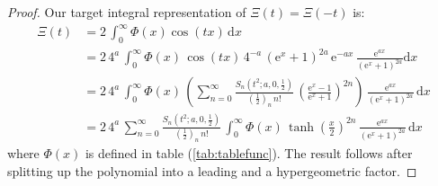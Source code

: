 \documentclass[a4paper,11pt,twoside]{amsart}
\begin{document}
\begin{proof}
Our target integral representation of $\Xi(t) = \Xi(-t)$ is:
\begin{align}
 \Xi(t) &= 2\,\int_{0}^\infty \Phi(x)\cos(tx)\, \mathrm{d}x \\
 &= 2\,4^a\,\int_{0}^\infty \Phi(x)\,\cos(tx)\,4^{-a}\,(\mathrm{e}^x+1)^{2a}\,\mathrm{e}^{-ax} \,\frac{\mathrm{e}^{ax}}{(\mathrm{e}^x+1)^{2a}} \mathrm{d}x \\
 &= 2\,4^a\,\int_{0}^\infty \Phi(x)\,\left(\sum_{n=0}^\infty \frac{S_n\left(t^2;a,0,\frac12\right)}{\left(\frac12\right)_n\,n!}\, \left(\frac{\textrm{e}^{x}-1}{\textrm{e}^{x}+1}\right)^{2n}\right)\,\frac{\mathrm{e}^{ax}}{(\mathrm{e}^x+1)^{2a}}\, \mathrm{d}x \\
 &= 2\,4^a\,\sum_{n=0}^\infty \frac{S_n\left(t^2;a,0,\frac12\right)}{\left(\frac12\right)_n\,n!}\,\int_{0}^{\infty} \Phi(x)\,\tanh\left(\frac{x}{2}\right)^{2n}\,\frac{\mathrm{e}^{ax}}{(\mathrm{e}^x+1)^{2a}}\,\mathrm{d}x \label{cdh0}
\end{align}
where $\Phi(x)$ is defined in table (\ref{tab:tablefunc}). The result follows after splitting up the polynomial into a leading and a hypergeometric factor.
\end{proof}
\end{document}
